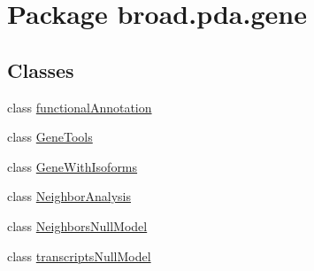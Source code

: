 \hypertarget{namespacebroad_1_1pda_1_1gene}{\section{Package broad.\+pda.\+gene}
\label{namespacebroad_1_1pda_1_1gene}
}
\subsection*{Classes}
\begin{DoxyCompactItemize}
\item 
class \hyperlink{classbroad_1_1pda_1_1gene_1_1functional_annotation}{functional\+Annotation}
\item 
class \hyperlink{classbroad_1_1pda_1_1gene_1_1_gene_tools}{Gene\+Tools}
\item 
class \hyperlink{classbroad_1_1pda_1_1gene_1_1_gene_with_isoforms}{Gene\+With\+Isoforms}
\item 
class \hyperlink{classbroad_1_1pda_1_1gene_1_1_neighbor_analysis}{Neighbor\+Analysis}
\item 
class \hyperlink{classbroad_1_1pda_1_1gene_1_1_neighbors_null_model}{Neighbors\+Null\+Model}
\item 
class \hyperlink{classbroad_1_1pda_1_1gene_1_1transcripts_null_model}{transcripts\+Null\+Model}
\end{DoxyCompactItemize}
